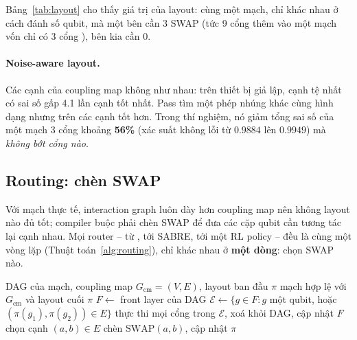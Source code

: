 Bảng~\ref{tab:layout} cho thấy giá trị của layout: cùng một mạch, chỉ khác nhau ở cách đánh số qubit,
mà một bên cần 3 SWAP (tức 9 cổng \cx{} thêm vào một mạch vốn chỉ có 3 cổng \cx{}), bên kia cần 0.

\paragraph{Noise-aware layout.} Các cạnh của coupling map không như nhau: trên thiết bị giả lập, cạnh
tệ nhất có sai số gấp 4.1 lần cạnh tốt nhất. Pass  tìm một phép nhúng khác cùng
hình dạng nhưng trên các cạnh tốt hơn. Trong thí nghiệm, nó giảm tổng sai số của một mạch 3 cổng
\cx{} khoảng \textbf{56\%} (xác suất không lỗi từ $0.9884$ lên $0.9949$) mà \emph{không bớt cổng nào}.

\subsection{Routing: chèn SWAP}
\label{sec:routing}

Với mạch thực tế, interaction graph luôn dày hơn coupling map nên không layout nào đủ tốt; compiler
buộc phải chèn SWAP để đưa các cặp qubit cần tương tác lại cạnh nhau. Mọi router -- từ
, tới SABRE, tới một RL policy -- đều là cùng một vòng lặp (Thuật toán~\ref{alg:routing}),
chỉ khác nhau ở \textbf{một dòng}: chọn SWAP nào.

\begin{algorithm}[h]
  \caption{Vòng lặp routing tổng quát}
  \label{alg:routing}
  \begin{algorithmic}[1]
    \Require DAG của mạch, coupling map $G_{\text{cm}}=(V,E)$, layout ban đầu $\pi$
    \Ensure mạch hợp lệ với $G_{\text{cm}}$ và layout cuối $\pi$
    \State $F \gets$ front layer của DAG
      \State $\mathcal{E} \gets \{g \in F : g$ một qubit, hoặc $(\pi(g_1),\pi(g_2)) \in E\}$
        \State thực thi mọi cổng trong $\mathcal{E}$, xoá khỏi DAG, cập nhật $F$
      \Else
        \State chọn cạnh $(a,b) \in E$ \Comment{\textcolor{ProbRed}{quyết định duy nhất}}
        \State chèn $\mathrm{SWAP}(a,b)$, cập nhật $\pi$
      \EndIf
    \EndWhile
  \end{algorithmic}
\end{algorithm}

